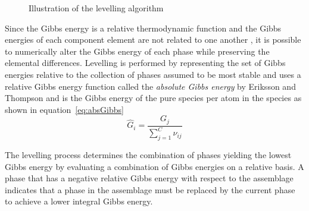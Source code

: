 \begin{figure}[htb]
  		\caption{Illustration of the levelling algorithm \cite{Loukusa:2014aa}}
  		\label{fig:levelling}
 	\end{figure}

	Since the Gibbs energy is a relative thermodynamic function and the Gibbs energies of each component element are not related to one another \cite{Eriksson89}, it is possible to numerically alter the Gibbs energy of each phase while preserving the elemental differences. Levelling is performed by representing the set of Gibbs energies relative to the collection of phases assumed to be most stable and uses a relative Gibbs energy function called the \textit{absolute Gibbs energy} by Eriksson and Thompson and is the Gibbs energy of the pure species per atom in the species as shown in equation~\eqref{eq:absGibbs}
	\begin{equation}\label{eq:absGibbs}
		\hat{G}_i = \frac{G_j}{\sum_{j=1}^C \nu_{ij}} 
	\end{equation}
	
	The levelling process determines the combination of phases yielding the lowest Gibbs energy by evaluating a combination of Gibbs energies on a relative basis. A phase that has a negative relative Gibbs energy with respect to the assemblage indicates that a phase in the assemblage must be replaced by the current phase to achieve a lower integral Gibbs energy. 
	
